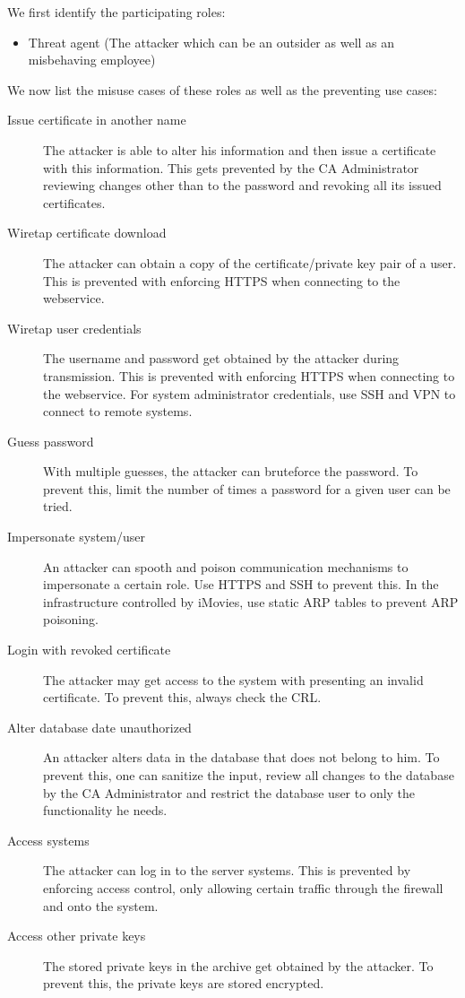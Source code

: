 \documentclass[a4paper, toc=index, 12pt, DIV14, twoside, BCOR2cm, headsepline, numbers=noenddot, bibliography=totoc]{report}
\begin{document}
We first identify the participating roles:
\begin{itemize}
\item Threat agent (The attacker which can be an outsider as well as an misbehaving employee)
\end{itemize}
We now list the misuse cases of these roles as well as the preventing use cases:
\begin{description}
\item[Issue certificate in another name ] The attacker is able to alter his information and then issue a certificate with this information. This gets prevented by the CA Administrator reviewing changes other than to the password and revoking all its issued certificates.
\item[Wiretap certificate download ] The attacker can obtain a copy of the certificate/private key pair of a user. This is prevented with enforcing HTTPS when connecting to the webservice.
\item[Wiretap user credentials ] The username and password get obtained by the attacker during transmission. This is prevented with enforcing HTTPS when connecting to the webservice. For system administrator credentials, use SSH and VPN to connect to remote systems.
\item[Guess password ] With multiple guesses, the attacker can bruteforce the password. To prevent this, limit the number of times a password for a given user can be tried.
\item[Impersonate system/user ] An attacker can spooth and poison communication mechanisms to impersonate a certain role. Use HTTPS and SSH to prevent this. In the infrastructure controlled by iMovies, use static ARP tables to prevent ARP poisoning.
\item[Login with revoked certificate ] The attacker may get access to the system with presenting an invalid certificate. To prevent this, always check the CRL.
\item[Alter database date unauthorized ] An attacker alters data in the database that does not belong to him. To prevent this, one can sanitize the input, review all changes to the database by the CA Administrator and restrict the database user to only the functionality he needs.
\item[Access systems ] The attacker can log in to the server systems. This is prevented by enforcing access control, only allowing certain traffic through the firewall and onto the system.
\item[Access other private keys ] The stored private keys in the archive get obtained by the attacker. To prevent this, the private keys are stored encrypted.

\end{description}
\end{document}
